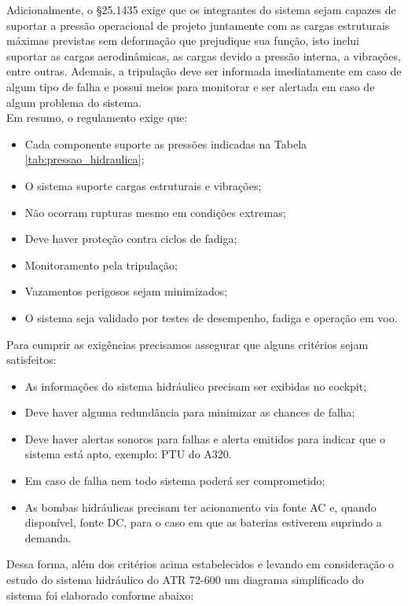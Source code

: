  Adicionalmente, o \S 25.1435 exige que os integrantes do sistema sejam capazes de suportar a pressão operacional de projeto juntamente com as cargas estruturais máximas previstas sem deformação que prejudique sua função, isto inclui suportar as cargas aerodinâmicas, as cargas devido a pressão interna, a vibrações, entre outras. Ademais, a tripulação deve ser informada imediatamente em caso de algum tipo de falha e possui meios para monitorar e ser alertada em caso de algum problema do sistema.\\
 Em resumo, o regulamento exige que:
 \begin{itemize}
     \item Cada componente suporte as pressões indicadas na Tabela \ref{tab:pressao_hidraulica};
     \item O sistema suporte cargas estruturais e vibrações;
     \item Não ocorram rupturas mesmo em condições extremas;
     \item Deve haver proteção contra ciclos de fadiga;
     \item Monitoramento pela tripulação;
     \item Vazamentos perigosos sejam minimizados;
     \item O sistema seja validado por testes de desempenho, fadiga e operação em voo.
 \end{itemize}
\vspace{0.5 cm}

 Para cumprir as exigências precisamos assegurar que alguns critérios sejam satisfeitos:
 \begin{itemize}
     \item As informações do sistema hidráulico precisam ser exibidas no cockpit;
     \item Deve haver alguma redundância para minimizar as chances de falha;
     \item Deve haver alertas sonoros para falhas e alerta emitidos para indicar que o sistema está apto, exemplo: PTU do A320.
     \item Em caso de falha nem todo sistema poderá ser comprometido;
     \item As bombas hidráulicas precisam ter acionamento via fonte AC e, quando disponível, fonte DC, para o caso em que as baterias estiverem suprindo a demanda.
 \end{itemize}

 Dessa forma, além dos critérios acima estabelecidos e levando em consideração o estudo do sistema hidráulico do ATR 72-600 um diagrama simplificado do sistema foi elaborado conforme abaixo:

